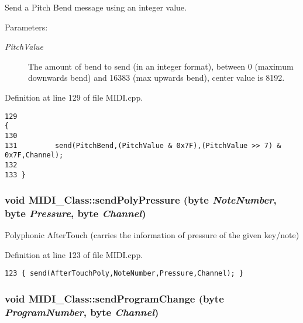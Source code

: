 Send a Pitch Bend message using an integer value. \begin{Desc}
\item[Parameters:]
\begin{description}
\item[{\em PitchValue}]The amount of bend to send (in an integer format), between 0 (maximum downwards bend) and 16383 (max upwards bend), center value is 8192. \end{description}
\end{Desc}


Definition at line 129 of file MIDI.cpp.

\begin{Code}\begin{verbatim}129                                                                    {
130 
131         send(PitchBend,(PitchValue & 0x7F),(PitchValue >> 7) & 0x7F,Channel);
132         
133 }
\end{verbatim}
\end{Code}


\hypertarget{class_m_i_d_i___class_028ec5a49dccf9c28b00e11e7a3d1d05}{
\subsubsection[{sendPolyPressure}]{\setlength{\rightskip}{0pt plus 5cm}void MIDI\_\-Class::sendPolyPressure (byte {\em NoteNumber}, \/  byte {\em Pressure}, \/  byte {\em Channel})}}
\label{class_m_i_d_i___class_028ec5a49dccf9c28b00e11e7a3d1d05}


Polyphonic AfterTouch (carries the information of pressure of the given key/note) 

Definition at line 123 of file MIDI.cpp.

\begin{Code}\begin{verbatim}123 { send(AfterTouchPoly,NoteNumber,Pressure,Channel); }
\end{verbatim}
\end{Code}


\hypertarget{class_m_i_d_i___class_803c2652837c09775d115354672bf69d}{
\subsubsection[{sendProgramChange}]{\setlength{\rightskip}{0pt plus 5cm}void MIDI\_\-Class::sendProgramChange (byte {\em ProgramNumber}, \/  byte {\em Channel})}}
\label{class_m_i_d_i___class_803c2652837c09775d115354672bf69d}



